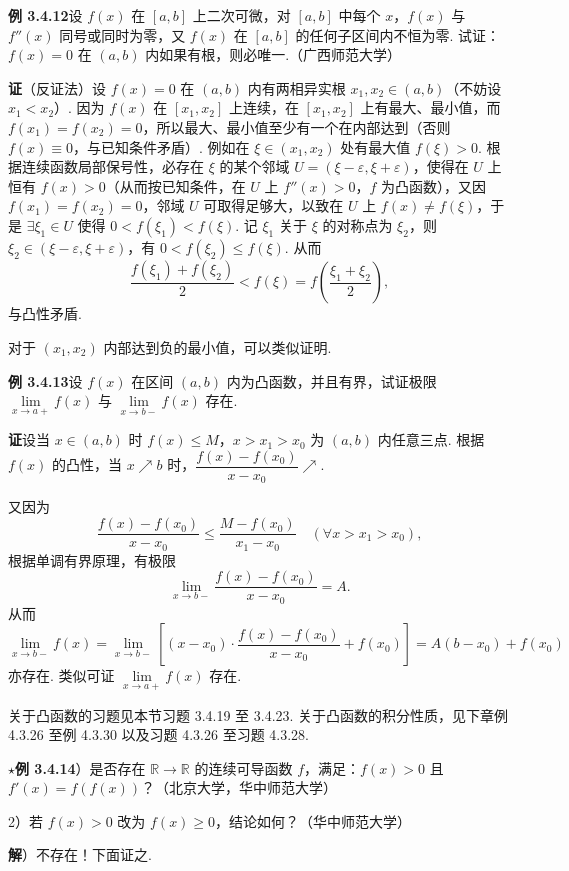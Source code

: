 \documentclass[UTF8, 12pt, fontset=fandol, oneside]{ctexart}
\begin{document}
\noindent\textbf{例 3.4.12}\quad 设 $f(x)$ 在 $[a,b]$ 上二次可微，对 $[a,b]$ 中每个 $x$，$f(x)$ 与 $f''(x)$ 同号或同时为零，又 $f(x)$ 在 $[a,b]$ 的任何子区间内不恒为零. 试证：$f(x)=0$ 在 $(a,b)$ 内如果有根，则必唯一.（广西师范大学）

\noindent\textbf{证}\quad （反证法）设 $f(x)=0$ 在 $(a,b)$ 内有两相异实根 $x_1,x_2\in(a,b)$（不妨设 $x_1<x_2$）. 因为 $f(x)$ 在 $[x_1,x_2]$ 上连续，在 $[x_1,x_2]$ 上有最大、最小值，而 $f(x_1)=f(x_2)=0$，所以最大、最小值至少有一个在内部达到（否则 $f(x)\equiv0$，与已知条件矛盾）. 例如在 $\xi\in(x_1,x_2)$ 处有最大值 $f(\xi)>0$. 根据连续函数局部保号性，必存在 $\xi$ 的某个邻域 $U=(\xi-\varepsilon,\xi+\varepsilon)$，使得在 $U$ 上恒有 $f(x)>0$（从而按已知条件，在 $U$ 上 $f''(x)>0$，$f$ 为凸函数），又因 $f(x_1)=f(x_2)=0$，邻域 $U$ 可取得足够大，以致在 $U$ 上 $f(x)\ne f(\xi)$，于是 $\exists\xi_1\in U$ 使得 $0<f(\xi_1)<f(\xi)$. 记 $\xi_1$ 关于 $\xi$ 的对称点为 $\xi_2$，则 $\xi_2\in(\xi-\varepsilon,\xi+\varepsilon)$，有 $0<f(\xi_2)\le f(\xi)$. 从而
\[
  \frac{f(\xi_1)+f(\xi_2)}2<f(\xi)
  =f\left(\frac{\xi_1+\xi_2}2\right),
\]
与凸性矛盾.

对于 $(x_1,x_2)$ 内部达到负的最小值，可以类似证明.

\noindent\textbf{例 3.4.13}\quad 设 $f(x)$ 在区间 $(a,b)$ 内为凸函数，并且有界，试证极限 $\lim\limits_{x\to a+}f(x)$ 与 $\lim\limits_{x\to b-}f(x)$ 存在.

\noindent\textbf{证}\quad 设当 $x\in(a,b)$ 时 $f(x)\le M$，$x>x_1>x_0$ 为 $(a,b)$ 内任意三点. 根据 $f(x)$ 的凸性，当 $x\nearrow b$ 时，$\dfrac{f(x)-f(x_0)}{x-x_0}\nearrow$.

又因为
\[
  \frac{f(x)-f(x_0)}{x-x_0}
  \le \frac{M-f(x_0)}{x_1-x_0}\quad(\forall x>x_1>x_0),
\]
根据单调有界原理，有极限
\[
  \lim_{x\to b-}\frac{f(x)-f(x_0)}{x-x_0}=A.
\]
从而
\[
  \lim_{x\to b-}f(x)
  =\lim_{x\to b-}\left[(x-x_0)\cdot\frac{f(x)-f(x_0)}{x-x_0}+f(x_0)\right]
  =A(b-x_0)+f(x_0)
\]
亦存在. 类似可证 $\lim\limits_{x\to a+}f(x)$ 存在.

关于凸函数的习题见本节习题 3.4.19 至 3.4.23. 关于凸函数的积分性质，见下章例 4.3.26 至例 4.3.30 以及习题 4.3.26 至习题 4.3.28.

\noindent\textbf{$\star$例 3.4.14}）是否存在 $\mathbb R\to\mathbb R$ 的连续可导函数 $f$，满足：$f(x)>0$ 且 $f'(x)=f(f(x))$？（北京大学，华中师范大学）

2）若 $f(x)>0$ 改为 $f(x)\ge0$，结论如何？（华中师范大学）

\noindent\textbf{解}）不存在！下面证之.
\end{document}
